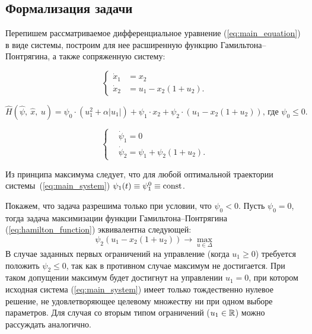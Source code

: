 \subsection{Формализация задачи}

Перепишем рассматриваемое дифференциальное уравнение (\ref{eq:main_equation}) в виде системы, построим для нее расширенную функцию Гамильтона--Понтрягина, а также сопряженную систему:

\begin{equation} \label{eq:main_system}
        \left\{
        \begin{aligned}
                \dot x_1 &= x_2 \\
                \dot x_2 &= u_1 - x_2(1 + u_2).
        \end{aligned}
        \right.
\end{equation}

\begin{equation} \label{eq:hamilton_function}
        \hat H (\hat\psi,\: \hat x,\: u) = \psi_0\cdot(u_1^2 + \alpha |u_1|) + \psi_1\cdot x_2 + \psi_2\cdot(u_1 - x_2(1 + u_2)) \mbox{, где $\psi_0 \leqslant 0.$}
\end{equation} 
        
\begin{equation}\label{eq:auxiliary_system}
        \left\{
        \begin{aligned}
                &\dot\psi_1 = 0\\
                &\dot\psi_2 = \psi_1 + \psi_2(1 + u_2).
        \end{aligned}
        \right.
\end{equation}

\begin{remark}
        Из принципа максимума следует, что для любой оптимальной траектории системы~(\ref{eq:main_system}) $\psi_1(t) \equiv \psi_1^0 \equiv \operatorname{const}$.
\end{remark}

\begin{remark}
        Покажем, что задача разрешима только при условии, что $\psi_0 < 0$. Пусть $\psi_0 = 0$, тогда задача максимизации функции Гамильтона--Понтрягина (\ref{eq:hamilton_function}) эквивалентна следующей:
        $$
                \psi_2(u_1 - x_2(1 + u_2)) \to \max\limits_{u \in \Delta}
        $$
        В случае заданных первых ограничений на управление (когда $u_1 \geqslant 0$) требуется положить $\psi_2 \leqslant 0$, так как в противном случае максимум не достигается. При таком допущении максимум будет достигнут на управлении $u_1 = 0$, при котором исходная система (\ref{eq:main_system}) имеет только тождественно нулевое решение, не удовлетворяющее целевому множеству ни при одном выборе параметров. Для случая со вторым типом ограничений ($u_1 \in \mathbb{R}$) можно рассуждать аналогично.
\end{remark}

